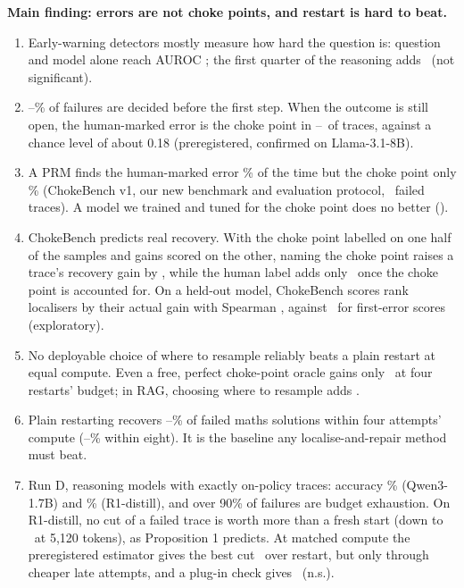 \documentclass[11pt,a4paper]{article}
\begin{document}
\textbf{Main finding: errors are not choke points, and restart is hard to beat.}
\begin{enumerate}
\item Early-warning detectors mostly measure how hard the question is: question and model alone
reach AUROC \aucQG; the first quarter of the reasoning adds \dIncA\ (not significant).
\item \QwenSmallAllCapPct--\QwenMathCapPct\% of failures are decided before the first step. When the
outcome is still open, the human-marked error is the choke point in \QwenTwoAllDec--\QwenSmallAllDec\
of traces, against a chance level of about 0.18 (preregistered, confirmed on Llama-3.1-8B).
\item A PRM finds the human-marked error \cbPrmDropAccHPct\% of the time but the choke point only
\cbPrmDropAccDPct\% (ChokeBench v1, our new benchmark and evaluation protocol, \cbN\ failed traces). A model we trained and tuned for the choke point
does no better (\cbLearnedAccD).
\item ChokeBench predicts real recovery. With the choke point labelled on one half of the samples
and gains scored on the other, naming the choke point raises a trace's recovery gain by \valBothD,
while the human label adds only \valBothE\ once the choke point is accounted for. On a held-out
model, ChokeBench scores rank localisers by their actual gain with Spearman \valRhoD, against
\valRhoE\ for first-error scores (exploratory).
\item No deployable choice of where to resample reliably beats a plain restart at equal compute. Even
a free, perfect choke-point oracle gains only \cbOracleGainB\ at four restarts' budget; in RAG,
choosing where to resample adds \rrHFive.
\item Plain restarting recovers \recMinFour--\recMaxFour\% of failed maths solutions within four
attempts' compute (\recMinEight--\recMaxEight\% within eight). It is the baseline any
localise-and-repair method must beat.
\item Run D, reasoning models with exactly on-policy traces: accuracy \rdQwenAcc\% (Qwen3-1.7B) and
\rdROneAcc\% (R1-distill), and over 90\% of failures are budget exhaustion. On R1-distill, no cut of a
failed trace is worth more than a fresh start (down to \rdDOneLast\ at 5,120 tokens), as Proposition 1
predicts. At matched compute the preregistered estimator gives the best cut \rdDTwo\ over restart, but only
through cheaper late attempts, and a plug-in check gives \rdDTwoPlug\ (n.s.).
\end{enumerate}
\end{document}
